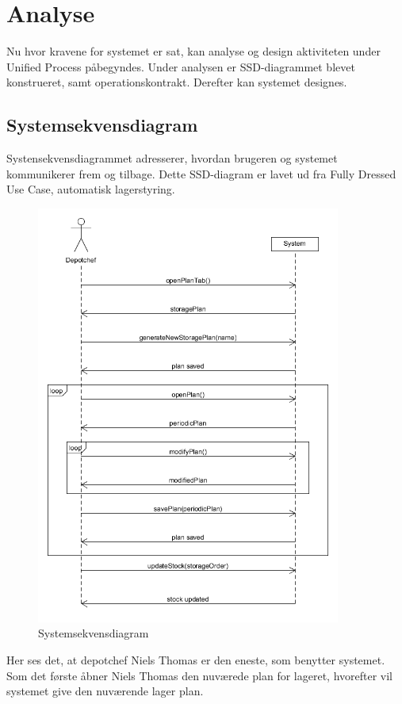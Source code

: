 \chapter{Analyse}\label{ch:analyse}

Nu hvor kravene for systemet er sat, kan analyse og design aktiviteten under Unified Process påbegyndes. Under analysen er SSD-diagrammet blevet konstrueret, samt operationskontrakt. Derefter kan systemet designes. 

\section{Systemsekvensdiagram}
Systensekvensdiagrammet\cite{Larman2004} adresserer, hvordan brugeren og systemet kommunikerer frem og tilbage. Dette SSD-diagram er lavet ud fra Fully Dressed Use Case, automatisk lagerstyring.

\begin{figure}[H]
    \centering
    \includegraphics[width=100mm]{figures/analyse/SSD.png}
    \caption{Systemsekvensdiagram}
    \label{fig:ssd}
\end{figure}

Her ses det, at depotchef Niels Thomas er den eneste, som benytter systemet. Som det første åbner Niels Thomas den nuværede plan for lageret, hvorefter vil systemet give den nuværende lager plan. 

